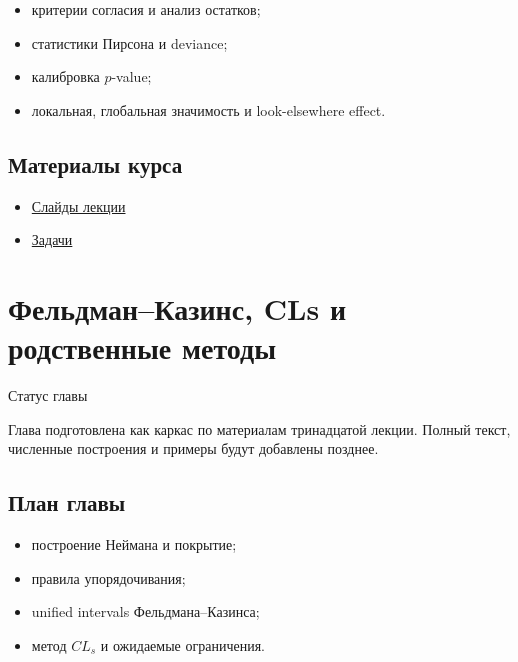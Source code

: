 \documentclass[
  russian,
  letterpaper,
]{scrbook}
\providecommand{\tightlist}{%
  \setlength{\itemsep}{0pt}\setlength{\parskip}{0pt}}
\begin{document}
\begin{itemize}
\tightlist
\item
  критерии согласия и анализ остатков;
\item
  статистики Пирсона и deviance;
\item
  калибровка \(p\)-value;
\item
  локальная, глобальная значимость и look-elsewhere effect.
\end{itemize}

\section{Материалы
курса}\label{ux43cux430ux442ux435ux440ux438ux430ux43bux44b-ux43aux443ux440ux441ux430-9}

\begin{itemize}
\tightlist
\item
  \href{https://neutrinohit.github.io/statistical-analysis-course/ru/slides/11_goodness_of_fit_and_significance.html}{Слайды
  лекции}
\item
  \href{https://neutrinohit.github.io/statistical-analysis-course/ru/slides/exercises/11_goodness_of_fit_and_significance_exercises.html}{Задачи}
\end{itemize}

\chapter{Фельдман--Казинс, CLs и родственные
методы}\label{ux444ux435ux43bux44cux434ux43cux430ux43dux43aux430ux437ux438ux43dux441-cls-ux438-ux440ux43eux434ux441ux442ux432ux435ux43dux43dux44bux435-ux43cux435ux442ux43eux434ux44b}

{Статус главы}

Глава подготовлена как каркас по материалам тринадцатой лекции. Полный
текст, численные построения и примеры будут добавлены позднее.

\section{План
главы}\label{ux43fux43bux430ux43d-ux433ux43bux430ux432ux44b-11}

\begin{itemize}
\tightlist
\item
  построение Неймана и покрытие;
\item
  правила упорядочивания;
\item
  unified intervals Фельдмана--Казинса;
\item
  метод \(CL_s\) и ожидаемые ограничения.
\end{itemize}
\end{document}
